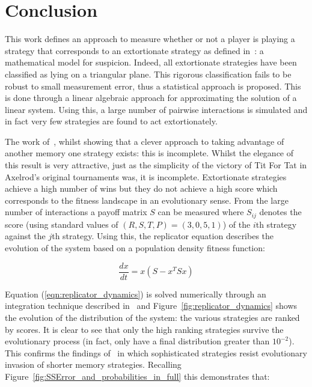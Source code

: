 \documentclass[a4paper]{article}
\begin{document}
\section{Conclusion}\label{sec:conclusion}

This work defines an approach to measure whether or not a player is playing a
strategy that corresponds to an extortionate strategy as defined
in~\cite{Press2012}: a mathematical model for suspicion. Indeed, all
extortionate strategies have been
 classified as lying on a triangular plane.
This rigorous classification fails to be robust to small measurement error, thus
a statistical approach is proposed.
This is done through a linear algebraic approach for approximating the solution
of a linear system. Using this, a large number of pairwise interactions is
simulated and in fact very few strategies are found to act extortionately.

The work of~\cite{Press2012}, whilst showing that a clever approach to taking
advantage of another memory one strategy exists: this is incomplete. Whilst the
elegance of this result is very attractive, just as the simplicity of the
victory of Tit For Tat in Axelrod's original tournaments was, it is incomplete.
Extortionate strategies achieve a high number of wins but they do not
achieve a high score which corresponds to the fitness landscape in an
evolutionary sense. From the large number of interactions a payoff matrix \(S\)
can be measured where \(S_{ij}\) denotes the score (using standard values of
\((R, S, T, P) = (3, 0, 5, 1)\)) of the \(i\)th strategy
against the \(j\)th strategy. Using this, the replicator equation
describes the evolution of the system based on a population density fitness
function:

\begin{equation}\label{eqn:replicator_dynamics}
    \frac{dx}{dt} = x(S-x^TS x)
\end{equation}

Equation (\ref{eqn:replicator_dynamics}) is solved numerically through an
integration technique described in~\cite{Petzold1983} and
Figure~\ref{fig:replicator_dynamics} shows the evolution of the distribution of
the system: the various strategies are ranked by scores. It is clear to see that
only the high ranking strategies survive the evolutionary process (in fact,
only 
have a final distribution greater than \(10 ^ {-2}\)). This confirms the
findings of~\cite{Moran1707} in which sophisticated strategies resist
evolutionary invasion of shorter memory strategies. Recalling
Figure~\ref{fig:SSError_and_probabilities_in_full} this demonstrates that:
\end{document}
